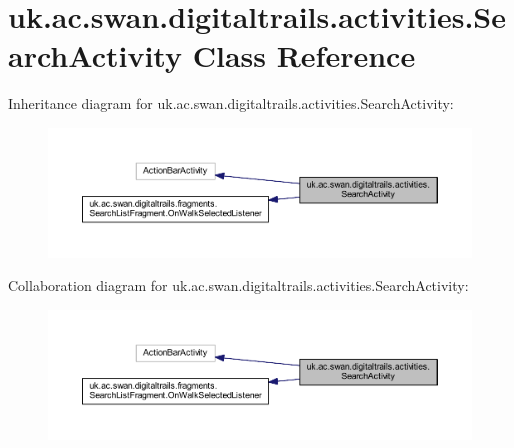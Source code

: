 \hypertarget{classuk_1_1ac_1_1swan_1_1digitaltrails_1_1activities_1_1_search_activity}{\section{uk.\+ac.\+swan.\+digitaltrails.\+activities.\+Search\+Activity Class Reference}
\label{classuk_1_1ac_1_1swan_1_1digitaltrails_1_1activities_1_1_search_activity}
}


Inheritance diagram for uk.\+ac.\+swan.\+digitaltrails.\+activities.\+Search\+Activity\+:\nopagebreak
\begin{figure}[H]
\begin{center}
\leavevmode
\includegraphics[width=350pt]{classuk_1_1ac_1_1swan_1_1digitaltrails_1_1activities_1_1_search_activity__inherit__graph}
\end{center}
\end{figure}


Collaboration diagram for uk.\+ac.\+swan.\+digitaltrails.\+activities.\+Search\+Activity\+:\nopagebreak
\begin{figure}[H]
\begin{center}
\leavevmode
\includegraphics[width=350pt]{classuk_1_1ac_1_1swan_1_1digitaltrails_1_1activities_1_1_search_activity__coll__graph}
\end{center}
\end{figure}
